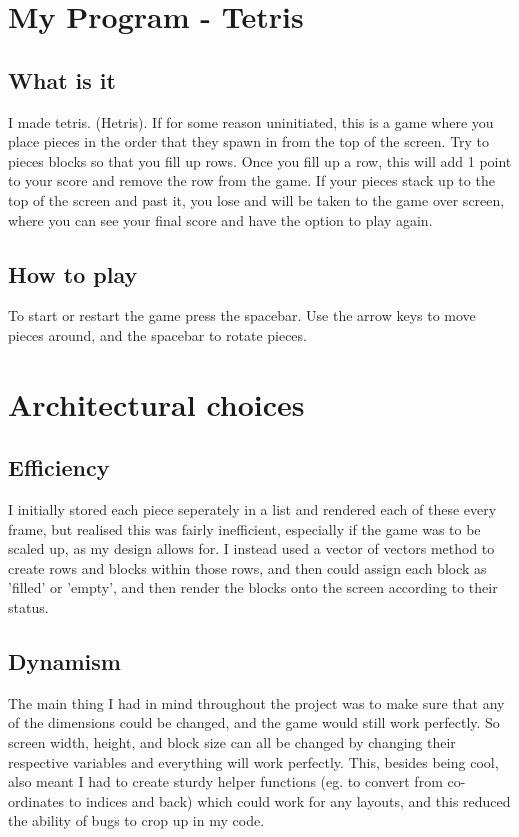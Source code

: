 \documentclass[12pt,a4paper]{article}
\begin{document}
\section{My Program - Tetris}
\subsection{What is it}
I made tetris. (Hetris). If for some reason uninitiated, this is a game where you place pieces in the order that they spawn in from the top of the screen. Try to pieces blocks so that you fill up rows. Once you fill up a row, this will add 1 point to your score and remove the row from the game. If your pieces stack up to the top of the screen and past it, you lose and will be taken to the game over screen, where you can see your final score and have the option to play again.
\subsection{How to play}
To start or restart the game press the spacebar. Use the arrow keys to move pieces around, and the spacebar to rotate pieces.
\section{Architectural choices}
\subsection{Efficiency}
I initially stored each piece seperately in a list and rendered each of these every frame, but realised this was fairly inefficient, especially if the game was to be scaled up, as my design allows for. I instead used a vector of vectors method to create rows and blocks within those rows, and then could assign each block as 'filled' or 'empty', and then render the blocks onto the screen according to their status.
\subsection{Dynamism}
The main thing I had in mind throughout the project was to make sure that any of the dimensions could be changed, and the game would still work perfectly. So screen width, height, and block size can all be changed by changing their respective variables and everything will work perfectly. This, besides being cool, also meant I had to create sturdy helper functions (eg. to convert from co-ordinates to indices and back) which could work for any layouts, and this reduced the ability of bugs to crop up in my code. 
\end{document}
